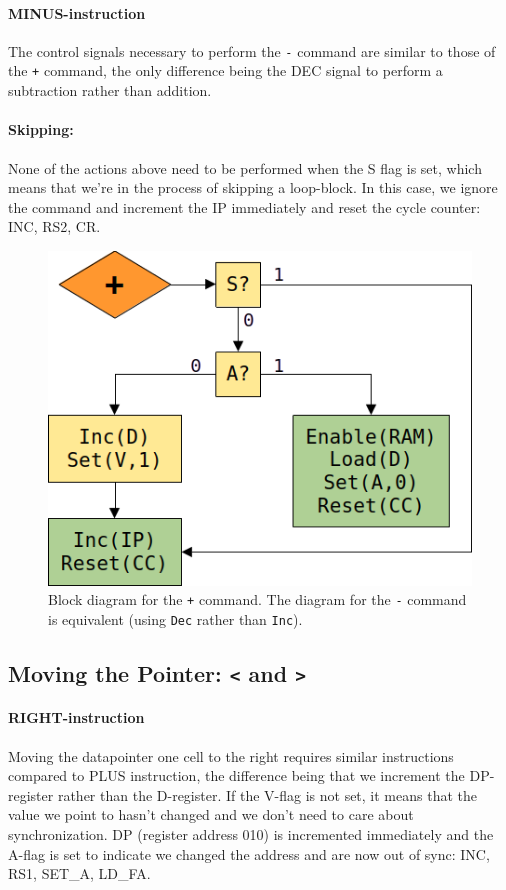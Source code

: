 \paragraph{MINUS-instruction} The control signals necessary to perform the \texttt{-} command are similar to those of the \texttt{+} command, the only difference being the DEC signal to perform a subtraction rather than addition.

\paragraph{Skipping:} None of the actions above need to be performed when the S flag is set, which means that we're in the process of skipping a loop-block. In this case, we ignore the command and increment the IP immediately and reset the cycle counter: INC, RS2, CR.

\begin{figure}[H]
  \centering
  \includegraphics[scale=0.3]{img/plusalg}
  \caption{Block diagram for the \texttt{+} command. The diagram for the \texttt{-} command is equivalent (using \texttt{Dec} rather than \texttt{Inc}).}
  \label{fig:plusalg}
\end{figure}

\subsection{Moving the Pointer: \texttt{<} and \texttt{>}} \label{sec:sequences:<>}
\paragraph{RIGHT-instruction} Moving the datapointer one cell to the right requires similar instructions compared to PLUS instruction, the difference being that we increment the DP-register rather than the D-register. If the V-flag is not set, it means that the value we point to hasn't changed and we don't need to care about synchronization. DP (register address 010) is incremented immediately and the A-flag is set to indicate we changed the address and are now out of sync: INC, RS1, SET\_A, LD\_FA.

